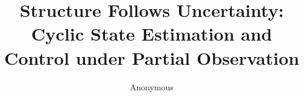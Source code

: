 \documentclass{article}
\title{Structure Follows Uncertainty:\\Cyclic State Estimation and Control under Partial Observation}
\author{Anonymous}
\date{}
\theoremstyle{plain}
\theoremstyle{definition}
\begin{document}
\maketitle

\begin{abstract}

\end{abstract}



\FloatBarrier




\FloatBarrier





\clearpage
\appendix
\raggedbottom
\renewcommand{\thefigure}{S\arabic{figure}}
\renewcommand{\thetable}{S\arabic{table}}
\setcounter{figure}{0}
\setcounter{table}{0}
\renewcommand{\theHfigure}{appendix.\arabic{figure}}
\renewcommand{\theHtable}{appendix.\arabic{table}}







\end{document}
